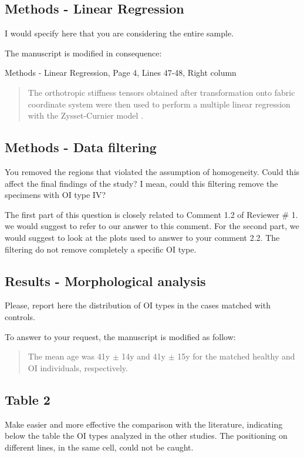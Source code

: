 \documentclass{AR2RC}
\begin{document}
\subsection{Methods - Linear Regression}
\RC I would specify here that you are considering the entire sample.

\AR The manuscript is modified in consequence:\par

Methods - Linear Regression, Page 4, Lines 47-48, Right column
\begin{quote}
	The orthotropic stiffness tensors obtained after transformation onto fabric coordinate system were then used to perform a multiple linear regression with the Zysset-Curnier model .
\end{quote}

\subsection{Methods - Data filtering}
\RC You removed the regions that violated the assumption of homogeneity. Could this affect the final findings of the study? I mean, could this filtering remove the specimens with OI type IV?

\AR The first part of this question is closely related to Comment 1.2 of Reviewer \# 1. we would suggest to refer to our answer to this comment. For the second part, we would suggest to look at the plots used to answer to your comment 2.2. The filtering do not remove completely a specific OI type.

\subsection{Results - Morphological analysis}
\RC Please, report here the distribution of OI types in the cases matched with controls.

\AR To answer to your request, the manuscript is modified as follow:
\begin{quote}
	The mean age was 41y $\pm$ 14y and 41y $\pm$ 15y for the matched healthy and OI individuals, respectively. 
\end{quote}


\subsection{Table 2}
\RC Make easier and more effective the comparison with the literature, indicating below the table the OI types analyzed in the other studies. The positioning on different lines, in the same cell, could not be caught.
\end{document}
